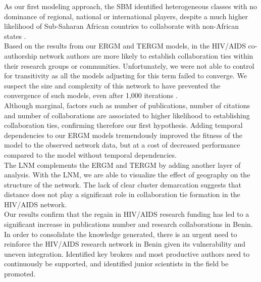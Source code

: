 As our first modeling approach, the SBM identified heterogeneous classes with no dominance of regional, national or international players, despite a much higher likelihood of Sub-Saharan African countries to collaborate with non-African states \cite{onyancha_knowledge_2011}.\\
Based on the results from our ERGM and TERGM models, in the HIV/AIDS co-authorship network authors are more likely to establish collaboration ties within their research groups or communities. Unfortunately, we were not able to control for transitivity as all the models adjusting for this term failed to converge. We suspect the size and complexity of this network to have prevented the convergence of such models, even after 1,000 iterations \cite{schmid_exponential_2017}. \\ 
Although marginal, factors such as number of publications, number of citations and number of collaborations are associated to higher likelihood to establishing collaboration ties, confirming therefore our first hypothesis. Adding temporal dependencies to our ERGM models tremendously improved the fitness of the model to the observed network data, but at a cost of decreased performance compared to the model without temporal dependencies.\\
The LNM complements the ERGM and TERGM by adding another layer of analysis. With the LNM, we are able to visualize the effect of geography on the structure of the network. The lack of clear cluster demarcation suggests that distance does not play a significant role in collaboration tie formation in the HIV/AIDS network. \\
Our results confirm that the regain in HIV/AIDS research funding has led to a significant increase in publications number and research collaborations in Benin. In order to consolidate the knowledge generated, there is an urgent need to reinforce the HIV/AIDS research network in Benin given its vulnerability and uneven integration. Identified key brokers and most productive authors need to continuously be supported, and identified junior scientists in the field be promoted.
